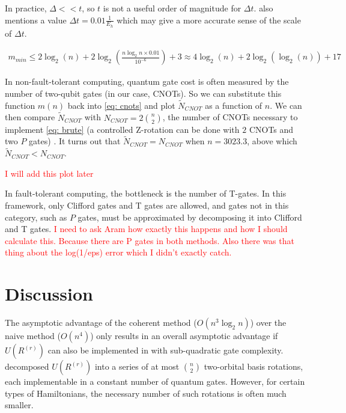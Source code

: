 In practice, $\Delta << t$, so $t$ is not a useful order of magnitude for $\Delta t$. \cite{Gate_Count} also mentions a value $\Delta t = 0.01 \frac{1}{E_h}$ which may give a more accurate sense of the scale of $\Delta t$.

\begin{equation}
    \begin{split}
        m_{min} \leq 2\log_2(n) + 2\log_2\left(\frac{n\log_2{n}\times 0.01}{10^{-6}}\right) + 3 \approx 4\log_2(n) + 2\log_2(\log_2(n)) + 17
    \end{split}
\end{equation}

In non-fault-tolerant computing, quantum gate cost is often measured by the number of two-qubit gates (in our case, CNOTs). So we can substitute this function $m(n)$ back into \eqref{eq: cnots} and plot $\tilde{N}_{CNOT}$ as a function of $n$. We can then compare $\tilde{N}_{CNOT}$ with $N_{CNOT} = 2{n \choose 2}$, the number of CNOTs necessary to implement \eqref{eq: brute} (a controlled Z-rotation can be done with $2$ CNOTs and two $P$ gates) \cite{gates}. It turns out that $\tilde{N}_{CNOT} = N_{CNOT}$ when $n = 3023.3$, above which $\tilde{N}_{CNOT} < N_{CNOT}$.

\textcolor{red}{I will add this plot later}

In fault-tolerant computing, the bottleneck is the number of T-gates. In this framework, only Clifford gates and T gates are allowed, and gates not in this category, such as $P$ gates, must be approximated by decomposing it into Clifford and T gates. \textcolor{red}{I need to ask Aram how exactly this happens and how I should calculate this. Because there are P gates in both methods. Also there was that thing about the log(1/eps) error which I didn't exactly catch.}




\section{Discussion}

The asymptotic advantage of the coherent method ($O(n^3\log_2{n})$) over the naive method ($O(n^4)$) only results in an overall asymptotic advantage if $U(R^{(r)})$ can also be implemented in with sub-quadratic gate complexity. \cite{FSN} decomposed $U(R^{(r)})$ into a series of at most ${n \choose 2}$ two-orbital basis rotations, each implementable in a constant number of quantum gates. However, for certain types of Hamiltonians, the necessary number of such rotations is often much smaller.

